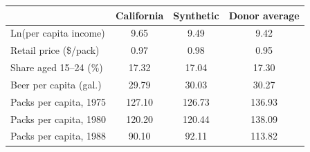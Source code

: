 \begin{tabular}{lccc}
\toprule
 & California & Synthetic & Donor average \\
\midrule
Ln(per capita income) & 9.65 & 9.49 & 9.42 \\
Retail price (\$/pack) & 0.97 & 0.98 & 0.95 \\
Share aged 15--24 (\%) & 17.32 & 17.04 & 17.30 \\
Beer per capita (gal.) & 29.79 & 30.03 & 30.27 \\
Packs per capita, 1975 & 127.10 & 126.73 & 136.93 \\
Packs per capita, 1980 & 120.20 & 120.44 & 138.09 \\
Packs per capita, 1988 & 90.10 & 92.11 & 113.82 \\
\bottomrule
\end{tabular}
